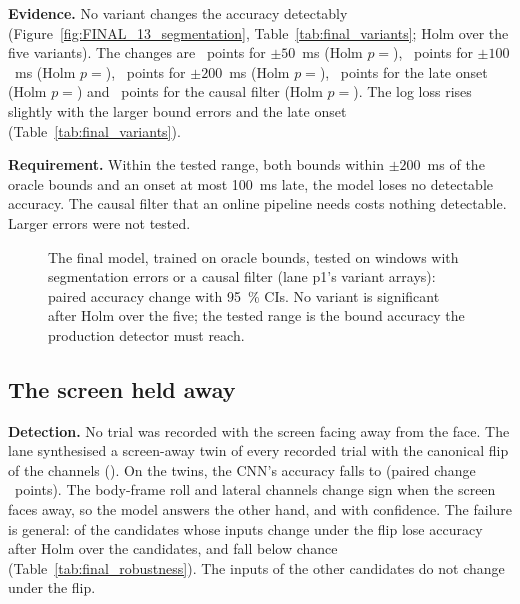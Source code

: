 \textbf{Evidence.}
No variant changes the accuracy detectably (Figure~\ref{fig:FINAL_13_segmentation}, Table~\ref{tab:final_variants}; Holm over the five variants).
The changes are ~points for $\pm 50$~ms (Holm $p = {}$), ~points for $\pm 100$~ms (Holm $p = {}$), ~points for $\pm 200$~ms (Holm $p = {}$), ~points for the late onset (Holm $p = {}$) and ~points for the causal filter (Holm $p = {}$).
The log loss rises slightly with the larger bound errors and the late onset (Table~\ref{tab:final_variants}).

\textbf{Requirement.}
Within the tested range, both bounds within $\pm 200$~ms of the oracle bounds and an onset at most 100~ms late, the model loses no detectable accuracy.
The causal filter that an online pipeline needs costs nothing detectable.
Larger errors were not tested.

\begin{figure}[htbp]
  \centering
  \caption{The final model, trained on oracle bounds, tested on windows with segmentation errors or a causal filter (lane p1's variant arrays): paired accuracy change with 95~\% CIs.
    No variant is significant after Holm over the five; the tested range is the bound accuracy the production detector must reach.}
  \label{fig:FINAL_13_segmentation}\label{fig:app:final-segmentation}
\end{figure}


\subsection{The screen held away}\label{app:final:screen}

\textbf{Detection.}
No trial was recorded with the screen facing away from the face.
The lane synthesised a screen-away twin of every recorded trial with the canonical flip of the channels ().
On the twins, the CNN's accuracy falls to  (paired change ~points).
The body-frame roll and lateral channels change sign when the screen faces away, so the model answers the other hand, and with confidence.
The failure is general:  of the  candidates whose inputs change under the flip lose accuracy after Holm over the candidates, and  fall below chance (Table~\ref{tab:final_robustness}).
The inputs of the other candidates do not change under the flip.

